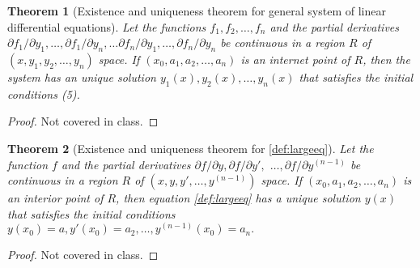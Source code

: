 \documentclass[oneside,11pt,pdftex,final]{book}%
\numberwithin{equation}{section}
\newtheorem{theorem}{Theorem}[chapter]%
\newtheorem{example}[theorem]{Example}
\numberwithin{section}{chapter}
\numberwithin{equation}{chapter}
\begin{document}
\begin{theorem}[Existence and uniqueness theorem for general system of linear differential equations]
	Let the functions $ f_1, f_2, \dots, f_n $ and the partial derivatives $ \partial f_1/\partial y_1, \dots, \partial f_1/\partial y_n, \dots \partial f_n/ \partial y_1, \dots, \partial f_n/\partial y_n $ be continuous in a region $ R $ of $ (x,y_1,y_2,\dots,y_n) $ space. If $ (x_0,a_1,a_2,\dots,a_n) $ is an internet point of $ R $, then the system has an unique solution $ y_1(x), y_2(x), \dots, y_n(x)$ that satisfies the initial conditions (5).
\end{theorem}
\begin{proof}
	Not covered in class.
\end{proof}
\begin{theorem}[Existence and uniqueness theorem for \ref{def:largeeq}]
	Let the function $ f $ and the partial derivatives $ \partial f/\partial y, \partial f/ \partial y',$ $\dots, \partial f/\partial y^{(n-1)} $ be continuous in a region $ R $ of $ (x,y,y',\dots, y^{(n-1)}) $ space. If $ (x_0, a_1, a_2, \dots, a_n) $ is an interior point of $ R $, then equation \ref{def:largeeq} has a unique solution $ y(x) $ that satisfies the initial conditions $ y(x_0) =a, y'(x_0)=a_2,\dots, y^{(n-1)}(x_0)=a_n.$
\end{theorem}
\begin{proof}
	Not covered in class.
\end{proof}
\end{document}
